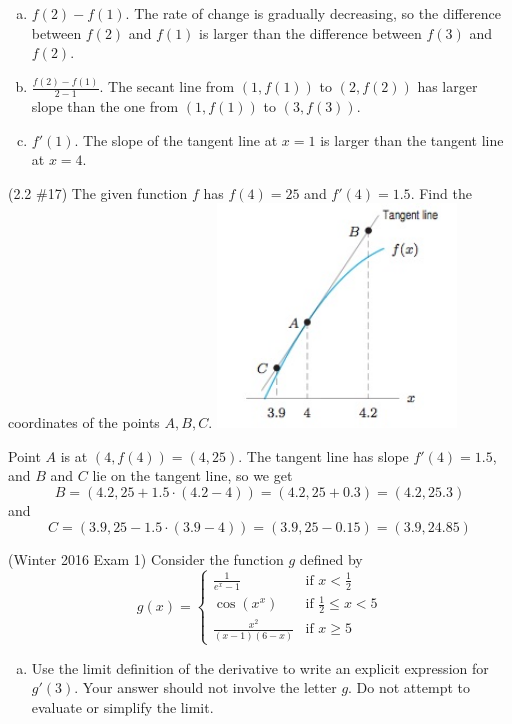 \documentclass[11pt]{exam}
\begin{document}
\begin{questions}
\begin{solution}
\begin{enumerate}[(a)]
           \item \(f(2)-f(1)\). The rate of change is gradually
             decreasing, so the difference between \(f(2)\) and
             \(f(1)\) is larger than the difference between \(f(3)\)
             and \(f(2)\).
           \item \(\frac{f(2)-f(1)}{2-1}\). The secant line from
             \((1,f(1))\) to \((2,f(2))\) has larger slope than the
             one from \((1,f(1))\) to \((3,f(3))\).
           \item \(f'(1)\). The slope of the tangent line at \(x=1\)
             is larger than the tangent line at \(x=4\).
           \end{enumerate}
         \end{solution}
\question (2.2 \#17) The given function $f$ has $f(4)=25$ and $f'(4)=1.5$.  Find the coordinates of the points $A, B, C$.
\includegraphics[width=2.5in]{no17graph.jpg}
\begin{solution}
  Point \(A\) is at \((4,f(4)) = (4,25)\). The tangent line has slope
  \(f'(4) = 1.5\), and \(B\) and \(C\) lie on the tangent line, so we
  get \[
    B = (4.2,25+1.5\cdot(4.2-4)) = (4.2,25+0.3) = (4.2,25.3)
  \]
  and \[
    C = (3.9,25-1.5\cdot(3.9-4)) = (3.9,25-0.15) = (3.9, 24.85)
  \]
\end{solution}
\question (Winter 2016 Exam 1)
Consider the function $g$ defined by
$$g(x) = \left\lbrace\begin{array}{ll} \frac{1}{e^x-1} & \textrm{if } x<\frac{1}{2} \\ \cos(x^x) & \textrm{if } \frac{1}{2} \leqslant x < 5 \\ \frac{x^2}{(x-1)(6-x)} & \textrm{if } x \geqslant 5\end{array}\right.$$
\begin{enumerate}[(a)]
\item Use the limit definition of the derivative to write an explicit expression for $g'(3)$. Your answer should not involve the letter $g$. Do not attempt to evaluate or simplify the limit.

\end{enumerate}
\end{questions}
\end{document}
